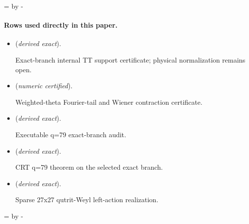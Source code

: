 \documentclass[11pt]{article}
\begin{document}
\par\begingroup{}=\pagegoal\advance{} by -\pagetotal\ifdim\dimen0<7\baselineskip\newpage\fi\endgroup
\paragraph{Rows used directly in this paper.}
\begin{itemize}
\setlength{\itemsep}{0.25em}
\item {} (\emph{derived exact}).\par Exact-branch internal TT support certificate; physical normalization remains open.
\item {} (\emph{numeric certified}).\par Weighted-theta Fourier-tail and Wiener contraction certificate.
\item {} (\emph{derived exact}).\par Executable q=79 exact-branch audit.
\item {} (\emph{derived exact}).\par CRT q=79 theorem on the selected exact branch.
\item {} (\emph{derived exact}).\par Sparse 27x27 qutrit-Weyl left-action realization.
\end{itemize}

\par\begingroup{}=\pagegoal\advance{} by -\pagetotal\ifdim\dimen0<7\baselineskip\newpage\fi\endgroup
\end{document}
